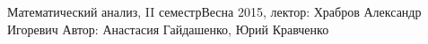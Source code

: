 


\BigHeader
	{Математический анализ, II семестр}{Весна 2015, лектор: Храбров Александр Игоревич}
	{Автор: Анастасия Гайдашенко, Юрий Кравченко}





